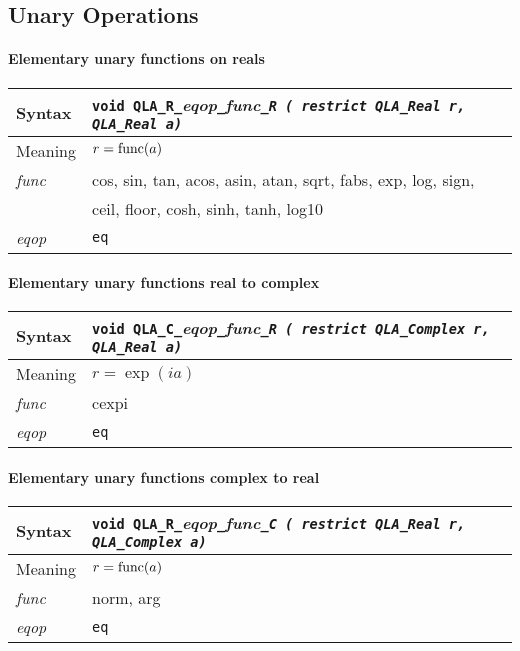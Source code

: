 \documentclass{article}
\newcommand{\tReal}{QLA\ttdash Real }
\newcommand{\tComplex}{QLA\ttdash Complex }
\newcommand{\namespace}{QLA}
\newcommand{\ttdash}{{\tt \_}}
\newcommand{\extraarg}{}
\newcommand{\protoUnaryQualCR}[1]{{\tt void \namespace}\ttdash{\tt C}\ttdash{\it eqop}\ttdash#1\ttdash{\tt R ( restrict \tComplex }{\tt *r, \tReal }{\tt *a\extraarg)}}
\newcommand{\protoUnaryQualRC}[1]{{\tt void \namespace}\ttdash{\tt R}\ttdash{\it eqop}\ttdash#1\ttdash{\tt C ( restrict \tReal }{\tt *r, \tComplex }{\tt *a\extraarg)}}
\newcommand{\protoUnaryQualRR}[1]{{\tt void \namespace}\ttdash{\tt R}\ttdash{\it eqop}\ttdash#1\ttdash{\tt R ( restrict \tReal }{\tt *r, \tReal }{\tt *a\extraarg)}}
\begin{document}
\subsection{Unary Operations}

\paragraph{Elementary unary functions on reals}

\begin{flushleft}
  \begin{tabular}{|l|l|}
  \hline
  Syntax      & \protoUnaryQualRR{\it func}  \\
  \hline
  Meaning     & $r = {\rm func}(a)$ \\
  \hline
  {\it func}  & cos, sin, tan, acos, asin, atan,
		sqrt, fabs, exp, log, sign, \\
              & ceil, floor, cosh, sinh, tanh, log10 \\
  \hline
  {\it eqop}  & {\tt eq} \\
  \hline
  \end{tabular}
\end{flushleft}

\paragraph{Elementary unary functions real to complex}

\begin{flushleft}
  \begin{tabular}{|l|l|}
  \hline
  Syntax      & \protoUnaryQualCR{\it func}  \\
  \hline
  Meaning     & $r = \exp(ia)$ \\
  \hline
  {\it func}  & cexpi \\
  \hline
  {\it eqop}  & {\tt eq} \\
  \hline
  \end{tabular}
\end{flushleft}

\paragraph{Elementary unary functions complex to real}

\begin{flushleft}
  \begin{tabular}{|l|l|}
  \hline
  Syntax      & \protoUnaryQualRC{\it func}  \\
  \hline
  Meaning     & $r = {\rm func}(a)$ \\
  \hline
  {\it func}  & norm, arg \\
  \hline
  {\it eqop}  & {\tt eq} \\
  \hline
  \end{tabular}
\end{flushleft}
\end{document}
